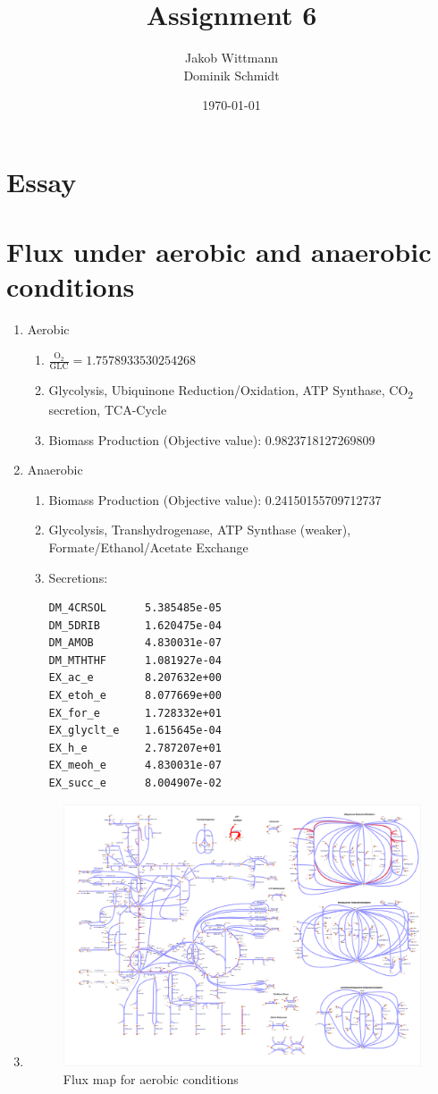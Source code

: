 \documentclass{scrartcl}
\title{Assignment 6}
\author{Jakob Wittmann\\Dominik Schmidt}
\date{\today}
\begin{document}
\maketitle
\section{Essay}
\section{Flux under aerobic and anaerobic conditions}
\begin{enumerate}
\item Aerobic
\begin{enumerate}
\item $\mathrm{\frac{O_2}{GLC}} = 1.7578933530254268$
\item Glycolysis, Ubiquinone Reduction/Oxidation, ATP Synthase, CO\textsubscript{2} secretion, TCA-Cycle
\item Biomass Production (Objective value): 0.9823718127269809
\end{enumerate}
\item Anaerobic
\begin{enumerate}
\item Biomass Production (Objective value): 0.24150155709712737
\item Glycolysis, Transhydrogenase, ATP Synthase (weaker), Formate/Ethanol/Acetate Exchange
\item Secretions: 
\begin{lstlisting}
DM_4CRSOL      5.385485e-05
DM_5DRIB       1.620475e-04
DM_AMOB        4.830031e-07
DM_MTHTHF      1.081927e-04
EX_ac_e        8.207632e+00
EX_etoh_e      8.077669e+00
EX_for_e       1.728332e+01
EX_glyclt_e    1.615645e-04
EX_h_e         2.787207e+01
EX_meoh_e      4.830031e-07
EX_succ_e      8.004907e-02
\end{lstlisting}
\end{enumerate}
\item 
\begin{figure}[H]
	
	\includegraphics[max width=\linewidth]{src/2_a.pdf}
	\caption{Flux map for aerobic conditions}
\end{figure}
\end{enumerate}
\end{document}
